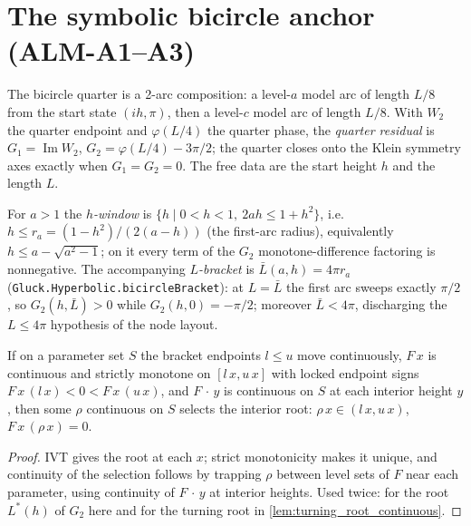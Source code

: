 \section{The symbolic bicircle anchor (ALM-A1--A3)}

The bicircle quarter is a 2-arc composition: a level-$a$ model arc of length
$L/8$ from the start state $(ih,\pi)$, then a level-$c$ model arc of length
$L/8$.  With $W_2$ the quarter endpoint and $\varphi(L/4)$ the quarter phase,
the \emph{quarter residual} is $G_1=\operatorname{Im}W_2$,
$G_2=\varphi(L/4)-3\pi/2$; the quarter closes onto the Klein symmetry axes
exactly when $G_1=G_2=0$.  The free data are the start height $h$ and the
length $L$.

\begin{definition}
  \label{def:bicircle_window}
  For $a>1$ the \emph{$h$-window} is $\{h\mid 0<h<1,\ 2ah\le 1+h^2\}$, i.e.\
  $h\le r_a=(1-h^2)/(2(a-h))$ (the first-arc radius), equivalently
  $h\le a-\sqrt{a^2-1}$; on it every term of the $G_2$ monotone-difference
  factoring is nonnegative.  The accompanying \emph{$L$-bracket} is
  $\bar L(a,h)=4\pi r_a$ (\texttt{Gluck.Hyperbolic.bicircleBracket}): at
  $L=\bar L$ the first arc sweeps exactly $\pi/2$, so $G_2(h,\bar L)>0$ while
  $G_2(h,0)=-\pi/2$; moreover $\bar L<4\pi$, discharging the $L\le4\pi$
  hypothesis of the node layout.
\end{definition}

\begin{lemma}
  \label{lem:continuous_root_of_strict_mono}
  If on a parameter set $S$ the bracket endpoints $l\le u$ move continuously,
  $F\,x$ is continuous and strictly monotone on $[l\,x,u\,x]$ with locked
  endpoint signs $F\,x\,(l\,x)<0<F\,x\,(u\,x)$, and $F\,\cdot\,y$ is
  continuous on $S$ at each interior height $y$, then some $\rho$ continuous
  on $S$ selects the interior root: $\rho\,x\in(l\,x,u\,x)$,
  $F\,x\,(\rho\,x)=0$.
\end{lemma}

\begin{proof}
  \leanok
  IVT gives the root at each $x$; strict monotonicity makes it unique, and
  continuity of the selection follows by trapping $\rho$ between level sets
  of $F$ near each parameter, using continuity of $F\,\cdot\,y$ at interior
  heights.  Used twice: for the root $L^*(h)$ of $G_2$ here and for the
  turning root in \cref{lem:turning_root_continuous}.
\end{proof}

